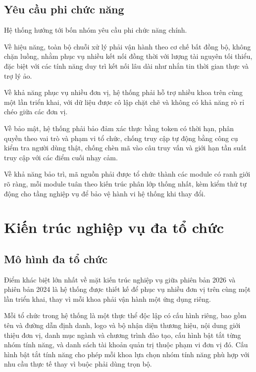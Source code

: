 \documentclass[12pt,a4paper,oneside]{report}
\begin{document}
\subsection{Yêu cầu phi chức năng}

Hệ thống hướng tới bốn nhóm yêu cầu phi chức năng chính.

Về hiệu năng, toàn bộ chuỗi xử lý phải vận hành theo cơ chế bất đồng bộ, không chặn luồng, nhằm phục vụ nhiều kết nối đồng thời với lượng tài nguyên tối thiểu, đặc biệt với các tính năng duy trì kết nối lâu dài như nhắn tin thời gian thực và trợ lý ảo.

Về khả năng phục vụ nhiều đơn vị, hệ thống phải hỗ trợ nhiều khoa trên cùng một lần triển khai, với dữ liệu được cô lập chặt chẽ và không có khả năng rò rỉ chéo giữa các đơn vị.

Về bảo mật, hệ thống phải bảo đảm xác thực bằng token có thời hạn, phân quyền theo vai trò và phạm vi tổ chức, chống truy cập tự động bằng công cụ kiểm tra người dùng thật, chống chèn mã vào câu truy vấn và giới hạn tần suất truy cập với các điểm cuối nhạy cảm.

Về khả năng bảo trì, mã nguồn phải được tổ chức thành các module có ranh giới rõ ràng, mỗi module tuân theo kiến trúc phân lớp thống nhất, kèm kiểm thử tự động cho tầng nghiệp vụ để bảo vệ hành vi hệ thống khi thay đổi.

\section{Kiến trúc nghiệp vụ đa tổ chức}

\subsection{Mô hình đa tổ chức}

Điểm khác biệt lớn nhất về mặt kiến trúc nghiệp vụ giữa phiên bản 2026 và phiên bản 2024 là hệ thống được thiết kế để phục vụ nhiều đơn vị trên cùng một lần triển khai, thay vì mỗi khoa phải vận hành một ứng dụng riêng.

Mỗi tổ chức trong hệ thống là một thực thể độc lập có cấu hình riêng, bao gồm tên và đường dẫn định danh, logo và bộ nhận diện thương hiệu, nội dung giới thiệu đơn vị, danh mục ngành và chương trình đào tạo, cấu hình bật tắt từng nhóm tính năng, và danh sách tài khoản quản trị thuộc phạm vi đơn vị đó. Cấu hình bật tắt tính năng cho phép mỗi khoa lựa chọn nhóm tính năng phù hợp với nhu cầu thực tế thay vì buộc phải dùng trọn bộ.
\end{document}
